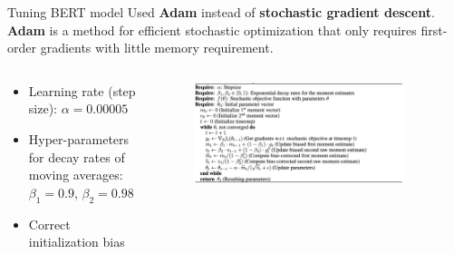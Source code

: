 \documentclass{beamer}
\begin{document}
\begin{frame}{Tuning BERT model}
  Used \textbf{Adam} instead of \textbf{stochastic gradient descent}. \textbf{Adam} is a method for efficient stochastic optimization that only requires first-order gradients with little memory requirement.\cite{kingma2017adam}
  \begin{columns}
    \begin{column}{0.3\textwidth}
      \begin{itemize}
        \item Learning rate (step size): $\alpha = 0.00005$
        \item Hyper-parameters for decay rates of moving averages: $\beta_1 = 0.9$, $\beta_2 = 0.98$
        \item Correct initialization bias
      \end{itemize}
    \end{column}
    \begin{column}{0.7\textwidth}
        \begin{figure}[ht!]
          \centering
          \includegraphics[width=0.9\textwidth]{images/adam_opt.png}
      \end{figure}     
    \end{column}
  \end{columns}
\end{frame}


\end{document}
